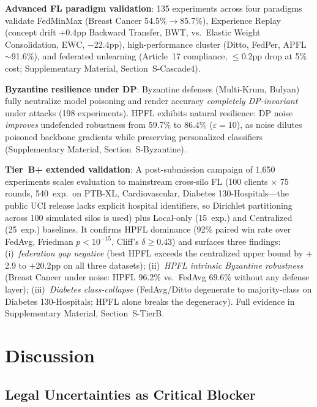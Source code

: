 \documentclass[conference]{IEEEtran}
\begin{document}
\textbf{Advanced FL paradigm validation}: 135 experiments across four paradigms validate FedMinMax (Breast Cancer 54.5\%$\to$85.7\%), Experience Replay (concept drift $+$0.4pp Backward Transfer, BWT, vs.\ Elastic Weight Consolidation, EWC, $-$22.4pp), high-performance cluster (Ditto, FedPer, APFL $\sim$91.6\%), and federated unlearning (Article~17 compliance, $\leq$0.2pp drop at 5\% cost; Supplementary Material, Section~S-Cascade4).

\textbf{Byzantine resilience under DP}: Byzantine defenses (Multi-Krum, Bulyan) fully neutralize model poisoning and render accuracy \textit{completely DP-invariant} under attacks (198 experiments). HPFL exhibits natural resilience: DP noise \textit{improves} undefended robustness from 59.7\% to 86.4\% ($\varepsilon{=}10$), as noise dilutes poisoned backbone gradients while preserving personalized classifiers (Supplementary Material, Section~S-Byzantine).

\textbf{Tier~B+ extended validation}: A post-submission campaign of 1,650 experiments scales evaluation to mainstream cross-silo FL (100 clients $\times$ 75 rounds, 540~exp.\ on PTB-XL, Cardiovascular, Diabetes 130-Hospitals---the public UCI release lacks explicit hospital identifiers, so Dirichlet partitioning across 100 simulated silos is used) plus Local-only (15~exp.) and Centralized (25~exp.) baselines. It confirms HPFL dominance (92\% paired win rate over FedAvg, Friedman $p<10^{-15}$, Cliff's $\delta\geq 0.43$) and surfaces three findings: (i)~\emph{federation gap negative} (best HPFL exceeds the centralized upper bound by $+$2.9 to $+$20.2pp on all three datasets); (ii)~\emph{HPFL intrinsic Byzantine robustness} (Breast Cancer under noise: HPFL 96.2\% vs.\ FedAvg 69.6\% without any defense layer); (iii)~\emph{Diabetes class-collapse} (FedAvg/Ditto degenerate to majority-class on Diabetes 130-Hospitals; HPFL alone breaks the degeneracy). Full evidence in Supplementary Material, Section~S-TierB.

\section{Discussion}
\label{sec:discussion}

\subsection{Legal Uncertainties as Critical Blocker}
\end{document}
